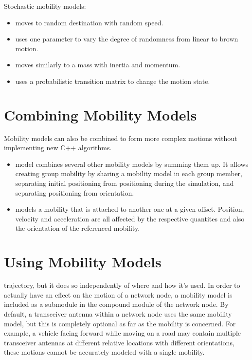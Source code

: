 Stochastic mobility models:

\begin{itemize}
        \item {} moves to random destination with random speed.
        \item {} uses one parameter to vary the degree of randomness from linear to brown motion.
        \item {} moves similarly to a mass with inertia and momentum.
        \item {} uses a probabilistic transition matrix to change the motion state.
\end{itemize}

\section{Combining Mobility Models}

Mobility models can also be combined to form more complex motions without implementing new C++ algorithms.

\begin{itemize}
        \item {} model combines several other mobility models by summing them up. It allows creating group mobility by sharing a mobility model in each group member, separating initial positioning from positioning during the simulation, and separating positioning from orientation.
        \item {} models a mobility that is attached to another one at a given offset. Position, velocity and acceleration are all affected by the respective quantites and also the orientation of the referenced mobility.
\end{itemize}

\section{Using Mobility Models}

trajectory, but it does so independently of where and how it's used. In
order to actually have an effect on the motion of a network node, a
mobility model is included as a submodule in the compound module of the
network node. By default, a transceiver antenna within a network node uses
the same mobility model, but this is completely optional as far as the
mobility is concerned. For example, a vehicle facing forward while moving
on a road may contain multiple transceiver antennas at different relative
locations with different orientations, these motions cannot be accurately
modeled with a single mobility.



